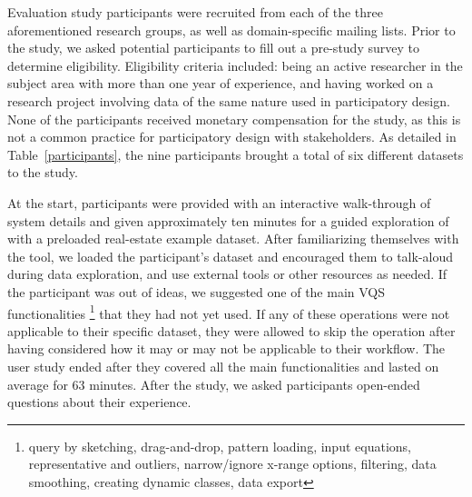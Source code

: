   \par Evaluation study participants were recruited from each of the three aforementioned research groups, as well as domain-specific mailing lists. Prior to the study, we asked potential participants to fill out a pre-study survey to determine eligibility. Eligibility criteria included: being an active researcher in the subject area with more than one year of experience, and having worked on a research project involving data of the same nature used in participatory design. None of the participants received monetary compensation for the study, as this is not a common practice for participatory design with stakeholders. As detailed in Table~\ref{participants}, the nine participants brought a total of six different datasets to the study. 
  \par At the start, participants were provided with an interactive walk-through of system details and given approximately ten minutes for a guided exploration of \zvpp with a preloaded real-estate example dataset. After familiarizing themselves with the tool, we loaded the participant's dataset and encouraged them to talk-aloud during data exploration, and use external tools or other resources as needed. If the participant was out of ideas, we suggested one of the main VQS functionalities \footnote{query by sketching, drag-and-drop, pattern loading, input equations, representative and outliers, narrow/ignore x-range options, filtering, data smoothing, creating dynamic classes,  data export} that they had not yet used. If any of these operations were not applicable to their specific dataset, they were allowed to skip the operation after having considered how it may or may not be applicable to their workflow. The user study ended after they covered all the main functionalities and lasted on average for 63 minutes. After the study, we asked participants open-ended questions about their experience.